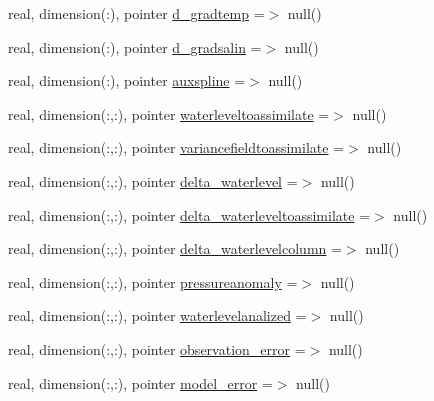 \begin{DoxyCompactItemize}
\item 
real, dimension(\+:), pointer \mbox{\hyperlink{structmoduleassimilation_1_1t__altimetric__assim_a64545fa2218c304935ab2e74a0901593}{d\+\_\+gradtemp}} =$>$ null()
\item 
real, dimension(\+:), pointer \mbox{\hyperlink{structmoduleassimilation_1_1t__altimetric__assim_a7b90c4a793a2d070f1d7b261d3eeb602}{d\+\_\+gradsalin}} =$>$ null()
\item 
real, dimension(\+:), pointer \mbox{\hyperlink{structmoduleassimilation_1_1t__altimetric__assim_abbcc86f441c6bcda89382499ef33fba5}{auxspline}} =$>$ null()
\item 
real, dimension(\+:,\+:), pointer \mbox{\hyperlink{structmoduleassimilation_1_1t__altimetric__assim_a961537a739537d8bc8e0134e7e39c8b8}{waterleveltoassimilate}} =$>$ null()
\item 
real, dimension(\+:,\+:), pointer \mbox{\hyperlink{structmoduleassimilation_1_1t__altimetric__assim_a6d0ac2e107227d8dfa0c50ae8e5295b9}{variancefieldtoassimilate}} =$>$ null()
\item 
real, dimension(\+:,\+:), pointer \mbox{\hyperlink{structmoduleassimilation_1_1t__altimetric__assim_a909d39b4cac99093b845692a31835fad}{delta\+\_\+waterlevel}} =$>$ null()
\item 
real, dimension(\+:,\+:), pointer \mbox{\hyperlink{structmoduleassimilation_1_1t__altimetric__assim_a059c65d6e30d3ba80ef95019401b663b}{delta\+\_\+waterleveltoassimilate}} =$>$ null()
\item 
real, dimension(\+:,\+:), pointer \mbox{\hyperlink{structmoduleassimilation_1_1t__altimetric__assim_ae059d92cf73e24d2af15941033c6955e}{delta\+\_\+waterlevelcolumn}} =$>$ null()
\item 
real, dimension(\+:,\+:), pointer \mbox{\hyperlink{structmoduleassimilation_1_1t__altimetric__assim_a4c4f38ce9d445755921d11b8bd92ea67}{pressureanomaly}} =$>$ null()
\item 
real, dimension(\+:,\+:), pointer \mbox{\hyperlink{structmoduleassimilation_1_1t__altimetric__assim_af6a550a77c138d28c10d22639430a8f0}{waterlevelanalized}} =$>$ null()
\item 
real, dimension(\+:,\+:), pointer \mbox{\hyperlink{structmoduleassimilation_1_1t__altimetric__assim_ab3783e4dc1ebc7eba08c7404043df8d7}{observation\+\_\+error}} =$>$ null()
\item 
real, dimension(\+:,\+:), pointer \mbox{\hyperlink{structmoduleassimilation_1_1t__altimetric__assim_abfa13de78a63995021050f468807753a}{model\+\_\+error}} =$>$ null()
\item 

\end{DoxyCompactItemize}
